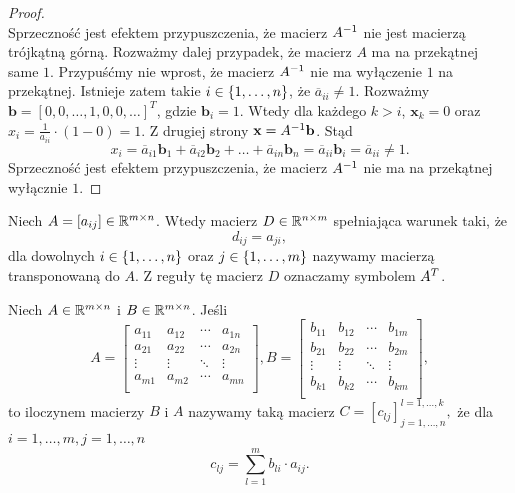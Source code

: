 \documentclass[12pt,a4paper]{report}
\newcommand{\vr}[1]{\mathbf{#1}}
\newcommand{\mx}[1]{{#1}}
\begin{document}
\begin{proof}
$$$$ 
Sprzeczność jest efektem przypuszczenia, że macierz $\inverse{\mx{A}}$ nie jest macierzą trójkątną górną.
Rozważmy dalej przypadek, że macierz $\mx{A}$ ma na przekątnej same $1$. Przypuśćmy nie wprost, że macierz $\inverse{\mx{A}}$ nie ma wyłączenie $1$ na przekątnej. Istnieje zatem takie $ i \in \left\lbrace {1, \ldots, n} \right\rbrace$, że $\overline{a}_{ii} \neq 1$. Rozważmy $\vr{b} = [0,0, \ldots, 1,0,0, \ldots]^{T}$, gdzie $\vr{b}_{i} = 1$. Wtedy dla każdego $k>i$, $\vr{x}_{k} = 0$ oraz $x_{i} = \frac{1}{a_{ii}} \cdot(1 - 0 ) = 1$. Z drugiej strony $\vr{x} = \inverse{\mx{A}} \vr{b}$. Stąd 
$$
x_{i} = \overline{a}_{i1} \vr{b}_{1} + \overline{a}_{i2} \vr{b}_{2} + \ldots + \overline{a}_{in} \vr{b}_{n} = \overline{a}_{ii} \vr{b}_{i} = \overline{a}_{ii} \neq 1.
$$
Sprzeczność jest efektem przypuszczenia, że macierz $\inverse{\mx{A}}$ nie ma na przekątnej wyłącznie $1$.

\end{proof}


\begin{definition}
Niech $\mx{A}=[a_{ij}] \in \setR^{m \times n}$. Wtedy macierz $D \in \mathbb{R}^{n \times m}$ spełniająca warunek taki, że
$$
d_{ij} = a_{ji},
$$
dla dowolnych $i \in \left\lbrace {1,\ldots, n} \right\rbrace$ oraz $j \in \left\lbrace {1,\ldots,m} \right\rbrace$ nazywamy macierzą transponowaną do $A$. Z reguły tę macierz $D$ oznaczamy symbolem ${A}^T$.
\end{definition}


\begin{definition}
Niech $\mx{A}\in \setR^{m \times n }$ i $\mx{B}\in \setR^{m \times n }$. Jeśli
$$
\mx{A} = \begin{bmatrix}
 a_{11} & a_{12} & \cdots & a_{1n} \\
         a_{21} & a_{22} & \cdots & a_{2n} \\
         \vdots & \vdots & \ddots & \vdots \\
         a_{m1} & a_{m2} & \cdots & a_{mn} \\
\end{bmatrix}, \mx{B} = \begin{bmatrix}
 b_{11} & b_{12} & \cdots & b_{1m} \\
         b_{21} & b_{22} & \cdots & b_{2m} \\
         \vdots & \vdots & \ddots & \vdots \\
         b_{k1} & b_{k2} & \cdots & b_{km} \\
\end{bmatrix},
$$ 
to iloczynem macierzy $\mx{B}$ i $\mx{A}$ nazywamy taką macierz $\mx{C} = [c_{lj}]_{j=1,\ldots,n}^{l=1,\ldots,k},$ że dla $i=1,\ldots,m, j=1,\ldots,n $
$$
c_{lj}= \sum_{l=1}^{m} b_{li} \cdot a_{ij}.
$$
\end{definition}
\end{document}
